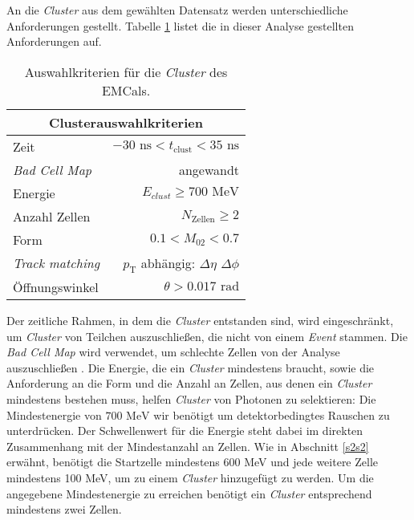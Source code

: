 An die \textit{Cluster} aus dem gewählten Datensatz werden unterschiedliche Anforderungen gestellt.
Tabelle \ref{tab:Cluster} listet die in dieser Analyse gestellten Anforderungen auf.
\begin{table}[b]
\centering
\begin{tabular}{|l|r|}
\hline
\multicolumn{2}{|c|}{Clusterauswahlkriterien}                   \\ \hline \hline
Zeit                    & $-30\text{ ns} < t_\text{clust}<35\text{ ns}$ \\ \hline
\textit{Bad Cell Map}   & angewandt                                     \\ \hline
Energie                 & $E_{clust}\geq700\text{ MeV}$                         \\ \hline
Anzahl Zellen           & $N_\text{Zellen}\geq 2$                       \\ \hline
Form                    & $0.1< M_{02}<0.7$                             \\ \hline
\textit{Track matching} & $p_\text{T}$ abhängig: $\Delta\eta$ $\Delta\phi$                                     \\ \hline
Öffnungswinkel          & $\theta>0.017\text{ rad}$                     \\ \hline
\end{tabular}
\caption{Auswahlkriterien für die \textit{Cluster} des EMCals.}
\label{tab:Cluster}
\end{table}
\newline
Der zeitliche Rahmen, in dem die \textit{Cluster} entstanden sind, wird eingeschränkt, um \textit{Cluster} von Teilchen auszuschließen, die nicht von einem \textit{Event} stammen.
Die \textit{Bad Cell Map} wird verwendet, um schlechte Zellen von der Analyse auszuschließen \cite{thesis:Joshua}.
\newline
Die Energie, die ein \textit{Cluster} mindestens braucht, sowie die Anforderung an die Form und die Anzahl an Zellen, aus denen ein \textit{Cluster} mindestens bestehen muss, helfen \textit{Cluster} von Photonen zu selektieren:
Die Mindestenergie von $700\text{ MeV}$ wir benötigt um detektorbedingtes  Rauschen zu unterdrücken.
Der Schwellenwert für die Energie steht dabei im direkten Zusammenhang mit der Mindestanzahl an Zellen.
Wie in Abschnitt \ref{s2s2} erwähnt, benötigt die Startzelle mindestens 600 MeV und jede weitere Zelle mindestens 100 MeV, um zu einem \textit{Cluster} hinzugefügt zu werden.
Um die angegebene Mindestenergie zu erreichen benötigt ein \textit{Cluster} entsprechend mindestens zwei Zellen.
